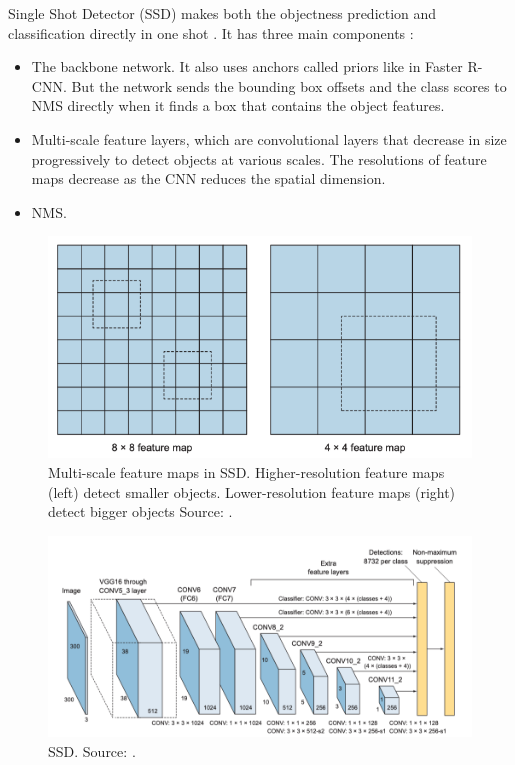 \documentclass[a4paper, 11pt, oneside]{article}
\begin{document}
Single Shot Detector (SSD) makes both the objectness prediction and classification directly in one shot
\cite{elgendy2020deep, liu2016ssd}. It has three main components \cite{elgendy2020deep, liu2016ssd}:

\begin{itemize}
  \item The backbone network. It also uses anchors called priors like in Faster R-CNN. But the network sends the bounding
  box offsets and the class scores to NMS directly when it finds a box that contains the object features.
  \item Multi-scale feature layers, which are convolutional layers that decrease in size progressively to detect objects
  at various scales. The resolutions of feature maps decrease as the CNN reduces the spatial dimension.
  \item NMS.
\end{itemize}

\begin{figure}[ht]
  \begin{center}
    \includegraphics[width=.8\textwidth]{ssd_feature_maps.png}
  \end{center}
  \caption{Multi-scale feature maps in SSD. Higher-resolution feature maps (left) detect smaller objects.
  Lower-resolution feature maps (right) detect bigger objects Source: \cite{elgendy2020deep}.}
\end{figure}

\begin{figure}[ht]
  \begin{center}
    \includegraphics[width=.8\textwidth]{ssd.png}
  \end{center}
  \caption{SSD. Source: \cite{elgendy2020deep}.}
\end{figure}
\end{document}
